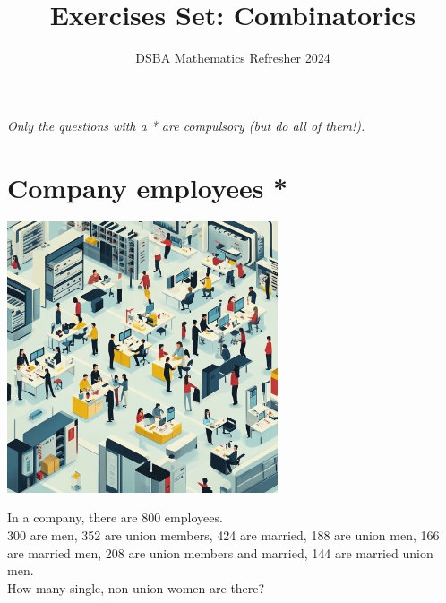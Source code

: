 \documentclass[]{article}
\title{Exercises Set: Combinatorics}
\author{DSBA Mathematics Refresher 2024}
\date{}
\begin{document}
	
	\maketitle
	
	\begin{center}
		\textit{Only the questions with a * are compulsory (but do all of them!).}
	\end{center}
	
	\section{Company employees *}
	\begin{center}
		\includegraphics[height=8cm]{company.png}
	\end{center}
	In a company, there are 800 employees.\\
	300 are men, 352 are union members, 424 are married, 188 are union men, 166 are married men, 208 are union members and married, 144 are married union men.\\
	How many single, non-union women are there?
	
	\newpage
\end{document}
